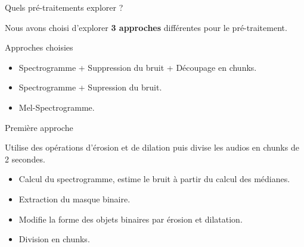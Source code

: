 \documentclass[compress,xcolor=table]{beamer}
\begin{document}


\begin{frame}{Quels pré-traitements explorer ?}

    Nous avons choisi d'explorer \textbf{3 approches} différentes pour le pré-traitement.

    \begin{block}{Approches choisies}
        \begin{itemize}
            \item Spectrogramme + Suppression du bruit + Découpage en chunks.
            \item Spectrogramme + Supression du bruit.
            \item Mel-Spectrogramme.
        \end{itemize}
    \end{block}

\end{frame}

\begin{frame}{Première approche}

    \begin{block}{ \cite{sprengelAudioBasedBird2016}}
        Utilise des opérations d'érosion et de dilation puis divise les audios en chunks de 2 secondes.
        \begin{itemize}
            \item Calcul du spectrogramme, estime le bruit à partir du calcul des médianes.
            \item Extraction du masque binaire.
            \item Modifie la forme des objets binaires par érosion et dilatation.
            \item Division en chunks.
        \end{itemize}
    \end{block}

\end{frame}
\end{document}
